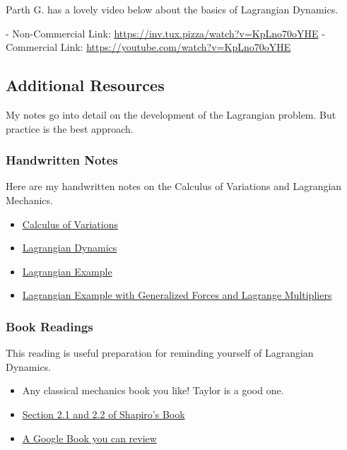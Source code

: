 Parth G. has a lovely video below about the basics of Lagrangian
Dynamics.

\href{https://inv.tux.pizza/watch?v=KpLno70oYHE}{\pandocbounded{\texttt{[image: https://markdown-videos-api.jorgenkh.no/youtube/KpLno70oYHE?width=720\&height=405]}}}
- Non-Commercial Link: \url{https://inv.tux.pizza/watch?v=KpLno70oYHE} -
Commercial Link: \url{https://youtube.com/watch?v=KpLno70oYHE}

\subsection{Additional Resources}\label{additional-resources}

My notes go into detail on the development of the Lagrangian problem.
But practice is the best approach.

\subsubsection{Handwritten Notes}\label{handwritten-notes}

Here are my handwritten notes on the Calculus of Variations and
Lagrangian Mechanics.

\begin{itemize}
\tightlist
\item
  \href{../../assets/notes/Notes-Calculus_of_Variations.pdf}{Calculus of
  Variations}
\item
  \href{../../assets/notes/Notes-Lagrangian_Dynamics.pdf}{Lagrangian
  Dynamics}
\item
  \href{../../assets/notes/Notes-Lagrangian_Example.pdf}{Lagrangian
  Example}
\item
  \href{../../assets/notes/Notes-Lagrangian_Example_Gen_Force.pdf}{Lagrangian
  Example with Generalized Forces and Lagrange Multipliers}
\end{itemize}

\subsubsection{Book Readings}\label{book-readings}

This reading is useful preparation for reminding yourself of Lagrangian
Dynamics.

\begin{itemize}
\tightlist
\item
  Any classical mechanics book you like! Taylor is a good one.
\item
  \href{https://www.physics.rutgers.edu/~shapiro/507/book.pdf}{Section
  2.1 and 2.2 of Shapiro's Book}
\item
  \href{https://www.google.com/books/edition/A_Student_s_Guide_to_Lagrangians_and_Ham/ebTCAQAAQBAJ?hl=en&gbpv=1&dq=lagrangian+dynamics+book&printsec=frontcover}{A
  Google Book you can review}
\end{itemize}

